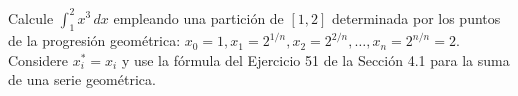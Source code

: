 \item Calcule $\int_1^2 x^3 \, dx$ empleando una partición de $[1, 2]$ determinada por los puntos de la progresión geométrica: $x_0 = 1, x_1 = 2^{1/n}, x_2 = 2^{2/n}, \dots, x_n = 2^{n/n} = 2$. Considere $x_i^* = x_i$ y use la fórmula del Ejercicio 51 de la Sección 4.1 para la suma de una serie geométrica.
